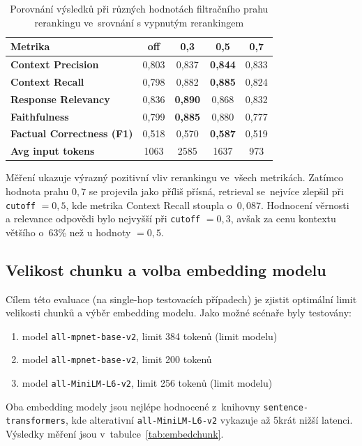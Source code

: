 \begin{table}[H]
    \centering
    \renewcommand{\arraystretch}{1.2}
    \begin{tabular}{|l|c|c|c|c|}
        \hline
        \textbf{Metrika} & \textbf{off} & \textbf{0{,}3} & \textbf{0{,}5} & \textbf{0{,}7} \\
        \hline
        \textbf{Context Precision}         & 0{,}803 & 0{,}837 & \textbf{0{,}844} & 0{,}833 \\
        \textbf{Context Recall}            & 0{,}798 & 0{,}882 & \textbf{0{,}885} & 0{,}824 \\
        \textbf{Response Relevancy}        & 0{,}836 & \textbf{0{,}890} & 0{,}868 & 0{,}832 \\
        \textbf{Faithfulness}              & 0{,}799 & \textbf{0{,}885} & 0{,}880 & 0{,}777 \\
        \textbf{Factual Correctness (F1)}  & 0{,}518 & 0{,}570 & \textbf{0{,}587} & 0{,}519 \\
        \textbf{Avg input tokens}          & 1063  & 2585  & 1637  & 973 \\
        \hline
    \end{tabular}
    \caption{Porovnání výsledků při různých hodnotách filtračního prahu rerankingu ve~srovnání s vypnutým rerankingem}
    \label{tab:rerank}
\end{table}

Měření ukazuje výrazný pozitivní vliv rerankingu ve~všech metrikách. Zatímco hodnota prahu $0{,}7$ se projevila jako příliš přísná, retrieval se~nejvíce zlepšil při \texttt{cutoff} $=0{,}5$, kde metrika Context Recall stoupla o~$0{,}087$. Hodnocení věrnosti a relevance odpovědi bylo nejvyšší při \texttt{cutoff} $=0{,}3$, avšak za cenu kontextu většího o~63\% než u hodnoty $=0{,}5$. 

\subsection{Velikost chunku a volba embedding modelu}
Cílem této evaluace (na single-hop testovacích případech) je zjistit optimální limit velikosti chunků a výběr embedding modelu. Jako možné scénaře byly testovány:
\begin{enumerate}
    \item model \texttt{all-mpnet-base-v2}, limit 384 tokenů (limit modelu)
    \item model \texttt{all-mpnet-base-v2}, limit 200 tokenů
    \item model \texttt{all-MiniLM-L6-v2}, limit 256 tokenů (limit modelu)
\end{enumerate}
Oba embedding modely jsou nejlépe hodnocené z~knihovny \texttt{sentence-transformers}, kde alterativní \texttt{all-MiniLM-L6-v2} vykazuje až 5krát nižší latenci. Výsledky měření jsou v~tabulce~\ref{tab:embedchunk}.

